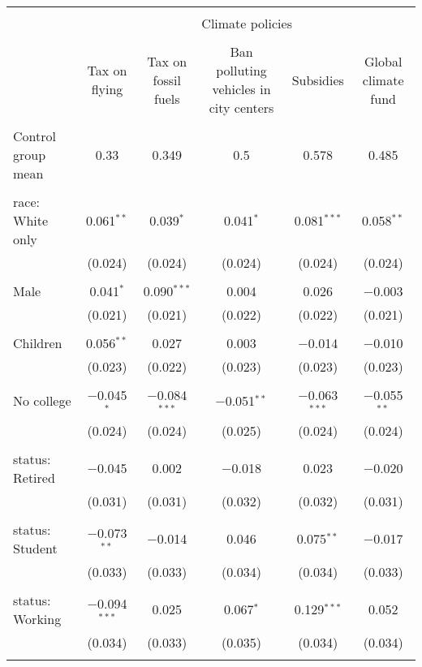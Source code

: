 
\begin{tabular}{@{\extracolsep{5pt}}lccccc} 
\\[-1.8ex]\hline 
\hline \\[-1.8ex] 
 & \multicolumn{5}{c}{Climate policies} \\ 
\cline{2-6} 
\\[-1.8ex] & Tax on flying & Tax on fossil fuels & Ban polluting vehicles in city centers & Subsidies & Global climate fund \\ 
\hline \\[-1.8ex] 
 Control group mean & 0.33 & 0.349 & 0.5 & 0.578 & 0.485  \\ \hline \\[-1.8ex] race: White only & 0.061$^{**}$ & 0.039$^{*}$ & 0.041$^{*}$ & 0.081$^{***}$ & 0.058$^{**}$ \\ 
  & (0.024) & (0.024) & (0.024) & (0.024) & (0.024) \\ 
  & & & & & \\ 
 Male & 0.041$^{*}$ & 0.090$^{***}$ & 0.004 & 0.026 & $-$0.003 \\ 
  & (0.021) & (0.021) & (0.022) & (0.022) & (0.021) \\ 
  & & & & & \\ 
 Children & 0.056$^{**}$ & 0.027 & 0.003 & $-$0.014 & $-$0.010 \\ 
  & (0.023) & (0.022) & (0.023) & (0.023) & (0.023) \\ 
  & & & & & \\ 
 No college & $-$0.045$^{*}$ & $-$0.084$^{***}$ & $-$0.051$^{**}$ & $-$0.063$^{***}$ & $-$0.055$^{**}$ \\ 
  & (0.024) & (0.024) & (0.025) & (0.024) & (0.024) \\ 
  & & & & & \\ 
 status: Retired & $-$0.045 & 0.002 & $-$0.018 & 0.023 & $-$0.020 \\ 
  & (0.031) & (0.031) & (0.032) & (0.032) & (0.031) \\ 
  & & & & & \\ 
 status: Student & $-$0.073$^{**}$ & $-$0.014 & 0.046 & 0.075$^{**}$ & $-$0.017 \\ 
  & (0.033) & (0.033) & (0.034) & (0.034) & (0.033) \\ 
  & & & & & \\ 
 status: Working & $-$0.094$^{***}$ & 0.025 & 0.067$^{*}$ & 0.129$^{***}$ & 0.052 \\ 
  & (0.034) & (0.033) & (0.035) & (0.034) & (0.034) \\ 
  & & & & & \\ 

\end{tabular}
